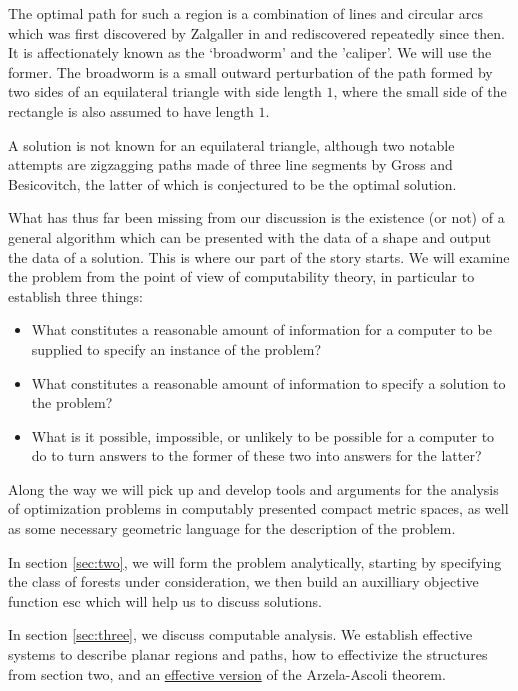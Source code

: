 \documentclass{journal}
\theoremstyle{definition}
\begin{document}
The optimal path for such a region is a combination of lines and circular arcs which was first discovered by Zalgaller in \cite{Zalgaller1} and rediscovered repeatedly since then. It is affectionately known as the `broadworm' and the 'caliper'. We will use the former. The broadworm is a small outward perturbation of the path formed by two sides of an equilateral triangle with side length $1$, where the small side of the rectangle is also assumed to have length $1$.

A solution is not known for an equilateral triangle, although two notable attempts are zigzagging paths made of three line segments by Gross and Besicovitch, the latter of which is conjectured to be the optimal solution.

What has thus far been missing from our discussion is the existence (or not) of a general algorithm which can be presented with the data of a shape and output the data of a solution. This is where our part of the story starts. We will examine the problem from the point of view of computability theory, in particular to establish three things:

\begin{itemize}
    \item What constitutes a reasonable amount of information for a computer to be supplied to specify an instance of the problem?
    \item What constitutes a reasonable amount of information to specify a solution to the problem?
    \item What is it possible, impossible, or unlikely to be possible for a computer to do to turn answers to the former of these two into answers for the latter?
\end{itemize}

Along the way we will pick up and develop tools and arguments for the analysis of optimization problems in computably presented compact metric spaces, as well as some necessary geometric language for the description of the problem.

In section \ref{sec:two}, we will form the problem analytically, starting by specifying the class of forests under consideration, we then build an auxilliary objective function \hyperref[dfn:esc]{$\mathrm{esc}$} which will help us to discuss solutions. 

In section \ref{sec:three}, we discuss computable analysis. We establish effective systems to describe planar regions and paths, how to effectivize the structures from section two, and an \hyperref[thm:effArAs]{effective version} of the Arzela-Ascoli theorem.
\end{document}

